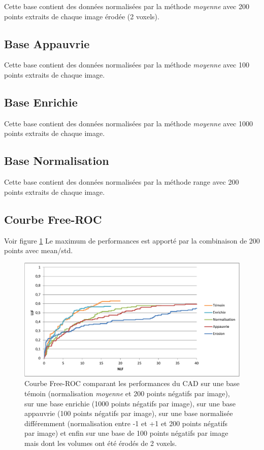 Cette base contient des données normalisées par la méthode \emph{moyenne} avec 200 points extraits de chaque image érodée (2 voxels).


\subsection{Base Appauvrie}

Cette base contient des données normalisées par la méthode \emph{moyenne} avec 100 points extraits de chaque image.


\subsection{Base Enrichie}

Cette base contient des données normalisées par la méthode \emph{moyenne} avec 1000 points extraits de chaque image.



\subsection{Base Normalisation}

Cette base contient des données normalisées par la méthode range avec 200 points extraits de chaque image.


\subsection{Courbe Free-ROC}

Voir figure \ref{lab:froc_comp_static}
Le maximum de performances est apporté par la combinaison de 200 points avec mean/std.

\begin{figure}[h!]
 
 \begin{center}
   \includegraphics[width=15cm]{images/FROC_param}
 \end{center}
 \caption{\label{lab:froc_comp_static} Courbe Free-ROC comparant les performances du CAD sur une base témoin (normalisation \emph{moyenne} et 200 points négatifs par image), sur une base enrichie (1000 points négatifs par image), sur une base appauvrie (100 points négatifs par image), sur une base normalisée différemment (normalisation entre -1 et +1 et 200 points négatifs par image) et enfin sur une base de 100 points négatifs par image mais dont les volumes ont été érodés de 2 voxels.}

\end{figure}


